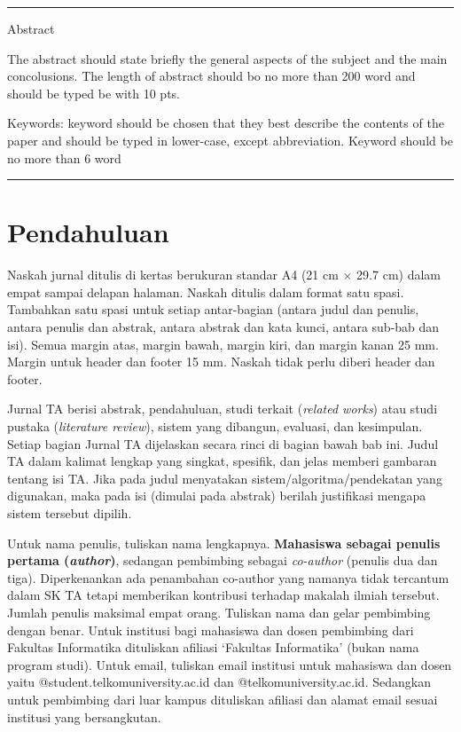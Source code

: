 {%



\noindent\rule{\textwidth}{1pt}
Abstract

The abstract should state briefly the general aspects of the subject and the main concolusions.  The length of abstract should bo no more than 200 word and  should be typed be with 10 pts.

 \bigskip
Keywords: keyword should be chosen that they best describe the contents of the paper and should be typed in lower-case, except abbreviation. Keyword should be no more than 6 word 

\noindent\rule{\textwidth}{1pt} }
   



\section{Pendahuluan}

Naskah jurnal ditulis di kertas berukuran standar A4 (21 cm $\times$ 29.7 cm) dalam empat sampai delapan halaman. Naskah ditulis dalam format satu spasi. Tambahkan satu spasi untuk setiap antar-bagian (antara judul dan penulis, antara penulis dan abstrak, antara abstrak dan kata kunci, antara sub-bab dan isi). Semua margin atas, margin bawah, margin kiri, dan margin kanan 25 mm. Margin untuk header dan footer 15 mm. Naskah tidak perlu diberi header dan footer. 

Jurnal TA berisi abstrak, pendahuluan, studi terkait (\textit{related works}) atau studi pustaka (\textit{literature review}), sistem yang dibangun,  evaluasi, dan kesimpulan. Setiap bagian Jurnal TA dijelaskan secara rinci di bagian bawah bab ini.
Judul TA dalam kalimat lengkap yang  singkat, spesifik, dan jelas memberi gambaran tentang isi TA. Jika pada judul menyatakan sistem/algoritma/pendekatan yang digunakan, maka pada isi (dimulai pada abstrak) berilah justifikasi mengapa sistem tersebut dipilih.

Untuk nama penulis, tuliskan nama lengkapnya. \textbf{Mahasiswa sebagai penulis pertama (\textit{author})}, sedangan pembimbing sebagai \textit{co-author} (penulis dua dan tiga). Diperkenankan ada penambahan co-author yang namanya tidak tercantum dalam SK TA tetapi memberikan kontribusi terhadap makalah ilmiah tersebut. Jumlah penulis maksimal empat orang. Tuliskan nama dan gelar pembimbing dengan benar. Untuk institusi bagi mahasiswa dan dosen pembimbing dari Fakultas Informatika dituliskan afiliasi ‘Fakultas Informatika’ (bukan nama program studi). Untuk email, tuliskan email institusi untuk mahasiswa dan dosen yaitu @student.telkomuniversity.ac.id dan @telkomuniversity.ac.id. Sedangkan untuk pembimbing dari luar kampus dituliskan afiliasi dan alamat email sesuai institusi yang bersangkutan.

